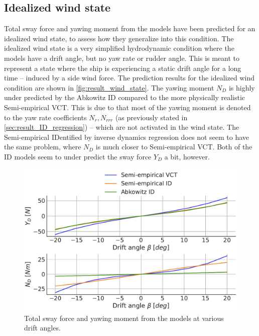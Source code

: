 \subsection{Idealized wind state}
Total sway force and yawing moment from the models have been predicted for an idealized wind state, to assess how they generalize into this condition.
The idealized wind state is a very simplified hydrodynamic condition where the models have a drift angle, but no yaw rate or rudder angle. This is meant to represent a state where the ship is experiencing a static drift angle for a long time -- induced by a side wind force.
The prediction results for the idealized wind condition are shown in \autoref{fig:result_wind_state}. The yawing moment $N_D$ is highly under predicted by the Abkowitz ID compared to the more physically realistic Semi-empirical VCT. This is due to that most of the yawing moment is denoted to the yaw rate coefficients $N_r,N_{rrr}$ (as previously stated in \autoref{sec:result_ID_regression}) -- which are not activated in the wind state. The Semi-empirical IDentified by inverse dynamics regression does not seem to have the same problem, where $N_D$ is much closer to Semi-empirical VCT. Both of the ID models seem to under predict the sway force $Y_D$ a bit, however.
\label{sec:wind_state}
\begin{figure}[h!]
    \includegraphics[width=\columnwidth]{figures/result_wind_state.forces.pdf}
    \caption{Total sway force and yawing moment from the models at various drift angles.}
    \label{fig:result_wind_state}
\end{figure}